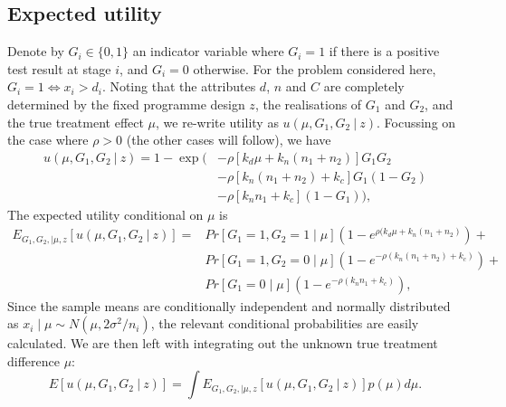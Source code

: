 \documentclass[sagev, Crown]{sagej} %
\begin{document}
\subsection{Expected utility}

Denote by $G_i \in \{0, 1\}$ an indicator variable where $G_i = 1$ if there is a positive test result at stage $i$, and $G_i = 0$ otherwise. For the problem considered here, $G_i = 1 \Leftrightarrow x_i > d_i$. Noting that the attributes $d$, $n$ and $C$ are completely determined by the fixed programme design $z$, the realisations of $G_1$ and $G_2$, and the true treatment effect $\mu$, we re-write utility as $u(\mu, G_1, G_2 ~|~ z)$. Focussing on the case where $\rho > 0$ (the other cases will follow), we have
\begin{equation}
\begin{split}
u(\mu, G_1, G_2 ~|~ z) = 1 - \exp(&-\rho[k_d\mu + k_n (n_1+n_2)] G_1 G_2 \\ 
  &- \rho[k_n (n_1+n_2) + k_c] G_1 (1 - G_2) \\
  &- \rho[k_n n_1 + k_c] (1 - G_1) ),
\end{split}
\end{equation}
The expected utility conditional on $\mu$ is
\begin{equation}\label{eqn:joint_cond_util}
\begin{split}
E_{G_1, G_2, | \mu, z}[u(\mu, G_1, G_2 ~|~ z)] =& Pr[G_1 = 1, G_2 = 1  \mid \mu]\left(1-e^{\rho(k_d\mu + k_n(n_1+n_2)}\right) + \\
& Pr[G_1 = 1,  G_2 = 0  \mid \mu] \left(1- e^{-\rho(k_n (n_1+n_2) + k_c)} \right) + \\
& Pr[G_1 = 0 \mid \mu] \left( 1-e^{-\rho(k_n n_1 + k_c)} \right),
\end{split}
\end{equation}
Since the sample means are conditionally independent and normally distributed as $x_i \mid \mu \sim N(\mu, 2\sigma^2/n_i)$, the relevant conditional probabilities are easily calculated. We are then left with integrating out the unknown true treatment difference $\mu$:
\begin{equation}\label{eqn:exp_util}
E[u(\mu, G_1, G_2 ~|~ z)] = \int E_{G_1, G_2, | \mu, z}[u(\mu, G_1, G_2 ~|~ z)] p(\mu) d\mu.
\end{equation}
\end{document}
